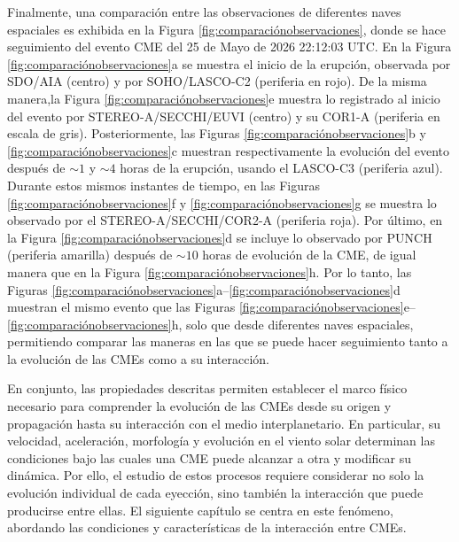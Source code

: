 Finalmente, una comparación entre las observaciones de diferentes naves espaciales es exhibida en la Figura \ref{fig:comparaciónobservaciones}, donde se hace seguimiento del evento CME del 25 de Mayo de 2026 22:12:03 UTC. En la Figura \ref{fig:comparaciónobservaciones}a se muestra el inicio de la erupción, observada por \ac{SDO}/\ac{AIA} (centro) y por \ac{SOHO}/\ac{LASCO}-C2 (periferia en rojo). De la misma manera,la Figura \ref{fig:comparaciónobservaciones}e muestra lo registrado al inicio del evento por \ac{STEREO}-A/\ac{SECCHI}/\ac{EUVI} (centro) y su COR1-A (periferia en escala de gris). Posteriormente, las Figuras \ref{fig:comparaciónobservaciones}b y \ref{fig:comparaciónobservaciones}c muestran respectivamente la evolución del evento después de $\sim1$ y $\sim4$ horas de la erupción, usando el \ac{LASCO}-C3 (periferia azul). Durante estos mismos instantes de tiempo, en las Figuras \ref{fig:comparaciónobservaciones}f y \ref{fig:comparaciónobservaciones}g se muestra lo observado por el \ac{STEREO}-A/\ac{SECCHI}/COR2-A (periferia roja). Por último, en la Figura \ref{fig:comparaciónobservaciones}d se incluye lo observado por \ac{PUNCH} (periferia amarilla) después de $\sim10$ horas de evolución de la CME, de igual manera que en la Figura \ref{fig:comparaciónobservaciones}h. Por lo tanto, las Figuras \ref{fig:comparaciónobservaciones}a--\ref{fig:comparaciónobservaciones}d muestran el mismo evento que las Figuras \ref{fig:comparaciónobservaciones}e--\ref{fig:comparaciónobservaciones}h, solo que desde diferentes naves espaciales, permitiendo comparar las maneras en las que se puede hacer seguimiento tanto a la evolución de las CMEs como a su interacción.

En conjunto, las propiedades descritas permiten establecer el marco físico necesario para comprender la evolución de las CMEs desde su origen y propagación hasta su interacción con el medio interplanetario. En particular, su velocidad, aceleración, morfología y evolución en el viento solar determinan las condiciones bajo las cuales una CME puede alcanzar a otra y modificar su dinámica. Por ello, el estudio de estos procesos requiere considerar no solo la evolución individual de cada eyección, sino también la interacción que puede producirse entre ellas. El siguiente capítulo se centra en este fenómeno, abordando las condiciones y características de la interacción entre CMEs.